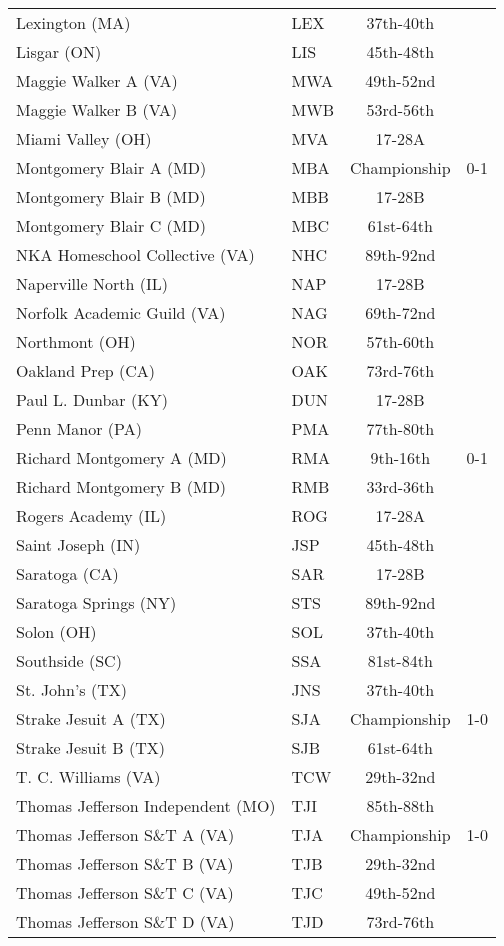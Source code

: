 \documentclass{article}%
\begin{document}
\begin{longtable}{|ll|c|c|}
Lexington (MA)&LEX&37th{-}40th&\\%
Lisgar (ON)&LIS&45th{-}48th&\\%
Maggie Walker A (VA)&MWA&49th{-}52nd&\\%
Maggie Walker B (VA)&MWB&53rd{-}56th&\\%
Miami Valley (OH)&MVA&17{-}28A&\\%
Montgomery Blair A (MD)&MBA&Championship&0{-}1\\%
Montgomery Blair B (MD)&MBB&17{-}28B&\\%
Montgomery Blair C (MD)&MBC&61st{-}64th&\\%
NKA Homeschool Collective (VA)&NHC&89th{-}92nd&\\%
Naperville North (IL)&NAP&17{-}28B&\\%
Norfolk Academic Guild (VA)&NAG&69th{-}72nd&\\%
Northmont (OH)&NOR&57th{-}60th&\\%
Oakland Prep (CA)&OAK&73rd{-}76th&\\%
Paul L. Dunbar (KY)&DUN&17{-}28B&\\%
Penn Manor (PA)&PMA&77th{-}80th&\\%
Richard Montgomery A (MD)&RMA&9th{-}16th&0{-}1\\%
Richard Montgomery B (MD)&RMB&33rd{-}36th&\\%
Rogers Academy (IL)&ROG&17{-}28A&\\%
Saint Joseph (IN)&JSP&45th{-}48th&\\%
Saratoga (CA)&SAR&17{-}28B&\\%
Saratoga Springs (NY)&STS&89th{-}92nd&\\%
Solon (OH)&SOL&37th{-}40th&\\%
Southside (SC)&SSA&81st{-}84th&\\%
St. John's (TX)&JNS&37th{-}40th&\\%
Strake Jesuit A (TX)&SJA&Championship&1{-}0\\%
Strake Jesuit B (TX)&SJB&61st{-}64th&\\%
T. C. Williams (VA)&TCW&29th{-}32nd&\\%
Thomas Jefferson Independent (MO)&TJI&85th{-}88th&\\%
Thomas Jefferson S\&T A (VA)&TJA&Championship&1{-}0\\%
Thomas Jefferson S\&T B (VA)&TJB&29th{-}32nd&\\%
Thomas Jefferson S\&T C (VA)&TJC&49th{-}52nd&\\%
Thomas Jefferson S\&T D (VA)&TJD&73rd{-}76th&\\%

\end{longtable}
\end{document}
